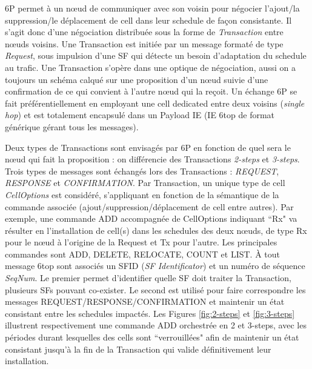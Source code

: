 \documentclass[]{report}
\begin{document}
\par 6P permet à un nœud de communiquer avec son voisin pour négocier l'ajout/la suppression/le déplacement de cell dans leur schedule de façon consistante. Il s'agit donc d'une négociation distribuée sous la forme de \textit{Transaction} entre nœuds voisins. Une Transaction est initiée par un message formaté de type \textit{Request}, sous impulsion d'une SF qui détecte un besoin d'adaptation du schedule au trafic. Une Transaction s'opère dans une optique de négociation, aussi on a toujours un schéma calqué sur une proposition d'un nœud suivie d'une confirmation de ce qui convient à l'autre nœud qui la reçoit. Un échange 6P se fait préférentiellement en employant une cell dedicated entre deux voisins (\textit{single hop}) et est totalement encapsulé dans un Payload IE (IE 6top de format générique gérant tous les messages).\\

\par Deux types de Transactions sont envisagés par 6P en fonction de quel sera le nœud qui fait la proposition : on différencie des Transactions \textit{2-steps} et \textit{3-steps}. Trois types de messages sont échangés lors des Transactions : \textit{REQUEST}, \textit{RESPONSE} et \textit{CONFIRMATION}. Par Transaction, un unique type de cell \textit{CellOptions} est considéré, s'appliquant en fonction de la sémantique de la commande associée (ajout/suppression/déplacement de cell entre autres). Par exemple, une commande ADD accompagnée de CellOptions indiquant ``Rx" va résulter en l'installation de cell(s) dans les schedules des deux nœuds, de type Rx pour le nœud à l'origine de la Request et Tx pour l'autre. Les principales commandes sont ADD, DELETE, RELOCATE, COUNT et LIST. À tout message 6top sont associés un SFID (\textit{SF Identificator}) et un numéro de séquence \textit{SeqNum}. Le premier permet d'identifier quelle SF doit traiter la Transaction, plusieurs SFs pouvant co-exister. Le second est utilisé pour faire correspondre les messages REQUEST/RESPONSE/CONFIRMATION et maintenir un état consistant entre les schedules impactés. Les Figures \ref{fig:2-steps} et \ref{fig:3-steps} illustrent respectivement une commande ADD orchestrée en 2 et 3-steps, avec les périodes durant lesquelles des cells sont ``verrouillées" afin de maintenir un état consistant jusqu'à la fin de la Transaction qui valide définitivement leur installation.\\
\end{document}
